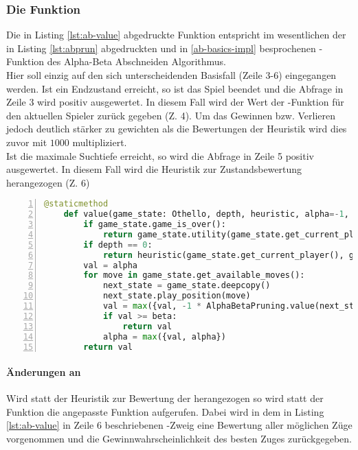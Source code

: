 \subsubsection{Die Funktion }
Die in Listing \ref{lst:ab-value} abgedruckte Funktion  entspricht im wesentlichen der in Listing \ref{lst:abprun} abgedruckten und in \ref{ab-basics-impl} besprochenen -Funktion des Alpha-Beta Abschneiden Algorithmus.
\\Hier soll einzig auf den sich unterscheidenden Basisfall (Zeile 3-6) eingegangen werden. Ist ein Endzustand erreicht, so ist das Spiel beendet und die Abfrage in Zeile 3 wird positiv ausgewertet. In diesem Fall wird der Wert der -Funktion für den aktuellen Spieler zurück gegeben (Z. 4). Um das Gewinnen bzw. Verlieren jedoch deutlich stärker zu gewichten als die Bewertungen der Heuristik wird dies zuvor mit $1000$ multipliziert.
\\Ist die maximale Suchtiefe erreicht, so wird die Abfrage in Zeile 5 positiv ausgewertet. In diesem Fall wird die Heuristik zur Zustandsbewertung herangezogen (Z. 6)
\begin{lstlisting}[caption = {\code{value} Funktion des Alpha-Beta Spielers}, language = python, captionpos = t , numbers=left, label={lst:ab-value}]
    @staticmethod
    def value(game_state: Othello, depth, heuristic, alpha=-1, beta=1):
        if game_state.game_is_over():
            return game_state.utility(game_state.get_current_player()) * 1000
        if depth == 0:
            return heuristic(game_state.get_current_player(), game_state)
        val = alpha
        for move in game_state.get_available_moves():
            next_state = game_state.deepcopy()
            next_state.play_position(move)
            val = max({val, -1 * AlphaBetaPruning.value(next_state, depth - 1, heuristic, -beta, -alpha)})
            if val >= beta:
                return val
            alpha = max({val, alpha})
        return val
\end{lstlisting}
\paragraph{Änderungen an }
Wird statt der Heuristik zur Bewertung der  herangezogen so wird statt der Funktion  die angepasste Funktion  aufgerufen. Dabei wird in dem in Listing \ref{lst:ab-value} in Zeile 6 beschriebenen -Zweig eine Bewertung aller möglichen Züge vorgenommen und die Gewinnwahrscheinlichkeit des besten Zuges zurückgegeben. 

